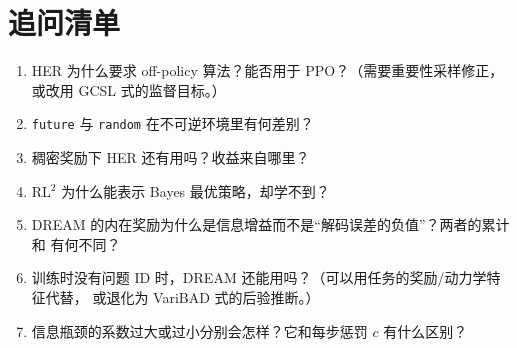 \documentclass[10pt,twocolumn,a4paper]{ctexart}
\begin{document}
\section{追问清单}
\begin{enumerate}
\item HER 为什么要求 off-policy 算法？能否用于 PPO？（需要重要性采样修正，或改用
GCSL 式的监督目标\citep{ghosh2021gcsl}。）
\item \texttt{future} 与 \texttt{random} 在不可逆环境里有何差别？
\item 稠密奖励下 HER 还有用吗？收益来自哪里？
\item RL$^2$ 为什么能表示 Bayes 最优策略，却学不到？
\item DREAM 的内在奖励为什么是信息增益而不是“解码误差的负值”？两者的累计和
有何不同？
\item 训练时没有问题 ID 时，DREAM 还能用吗？（可以用任务的奖励/动力学特征代替，
或退化为 VariBAD 式的后验推断。）
\item 信息瓶颈的系数过大或过小分别会怎样？它和每步惩罚 $c$ 有什么区别？
\end{enumerate}



\end{document}
